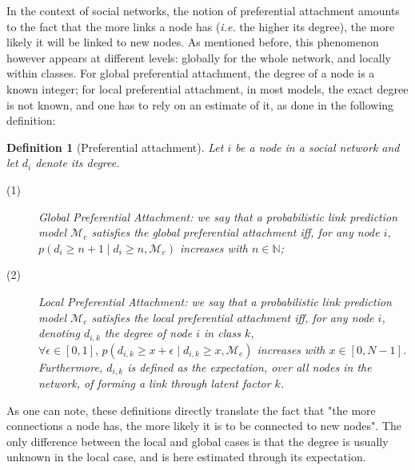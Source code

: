 \documentclass[9pt,twocolumn,twoside]{pnas-new}
\newcommand{\pr}{p}
\newtheorem{definition}{Definition}[section]
\begin{document}
In the context of social networks, the notion of preferential attachment amounts to the fact that the more links a node has (\textit{i.e.} the higher its degree), the more likely it will be linked to new nodes. As mentioned before, this phenomenon however appears at different levels: globally for the whole network, and locally within classes. For global preferential attachment, the degree of a node is a known integer; for local preferential attachment, in most models, the exact degree is not known, and one has to rely on an estimate of it, as done in the following definition:
%
\begin{definition}[Preferential attachment]
Let $i$ be a node in a social network and let $d_i$ denote its degree. 
\begin{description}
 \item[(1)] \emph{Global Preferential Attachment}: we say that a probabilistic link prediction model $\mathcal{M}_e$ satisfies the global preferential attachment iff, for any node $i$, $\pr(d_i \ge n+1 \mid d_i \ge n, \mathcal{M}_e)$ increases with $n \in \mathbb{N}$;
 \item[(2)] \emph{Local Preferential Attachment}: we say that a probabilistic link prediction model $\mathcal{M}_e$ satisfies the local preferential attachment iff, for any node $i$, denoting $d_{i,k}$ the degree of node $i$ in class $k$, $\forall \epsilon \in [0,1], \, \pr(d_{i,k} \ge x+\epsilon \mid d_{i,k} \ge x, \mathcal{M}_e)$ increases with $x \in [0,N-1]$. Furthermore, $d_{i,k}$ is defined as the expectation, over all nodes in the network, of forming a link through latent factor $k$.
\end{description}
\label{def:burst-soc-net}
\end{definition}
%
As one can note, these definitions directly translate the fact that "the more connections a node has, the more likely it is to be connected to new nodes". The only difference between the local and global cases is that the degree is usually unknown in the local case, and is here estimated through its expectation.
\end{document}
